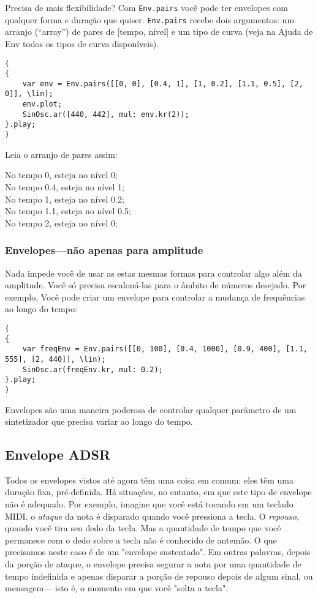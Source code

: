 Precisa de mais flexibilidade? Com \texttt{Env.pairs} você pode ter envelopes com qualquer forma e duração que quiser. \texttt{Env.pairs} recebe dois argumentos: um arranjo (“array”) de pares de [tempo, nível] e um tipo de curva (veja na Ajuda de Env todos os tipos de curva disponíveis).

 
\begin{lstlisting}[style=SuperCollider-IDE, basicstyle=\scttfamily\footnotesize]
(
{
	var env = Env.pairs([[0, 0], [0.4, 1], [1, 0.2], [1.1, 0.5], [2, 0]], \lin);
	env.plot;
	SinOsc.ar([440, 442], mul: env.kr(2));
}.play;
)
\end{lstlisting}
 
Leia o arranjo de pares assim:
\begin{center}
No tempo 0, esteja no nível 0;\\
No tempo 0.4, esteja no nível 1;\\
No tempo 1, esteja no nível 0.2;\\
No tempo 1.1, esteja no nível 0.5;\\
No tempo 2, esteja no nível 0;
\end{center}

\subsubsection{Envelopes---não apenas para amplitude}

Nada impede você de usar as estas mesmas formas para controlar algo além da amplitude. Você só precisa escaloná-las para o âmbito de números desejado. Por exemplo, Você pode criar um envelope para controlar a mudança de frequências ao longo do tempo:

\begin{lstlisting}[style=SuperCollider-IDE, basicstyle=\scttfamily\footnotesize]
(
{
	var freqEnv = Env.pairs([[0, 100], [0.4, 1000], [0.9, 400], [1.1, 555], [2, 440]], \lin);
	SinOsc.ar(freqEnv.kr, mul: 0.2);
}.play;
)
\end{lstlisting}

Envelopes são uma maneira poderosa de controlar qualquer parâmetro de um sintetizador que precisa variar ao longo do tempo.

\subsection{Envelope ADSR}

Todos os envelopes vistos até agora têm uma coisa em comum: eles têm uma duração fixa, pré-definida. Há situações, no entanto, em que este tipo de envelope não é adequado. Por exemplo, imagine que você está tocando em um teclado MIDI. o \textit{ataque} da nota é disparado quando você pressiona a tecla. O \textit{repouso}, quando você tira seu dedo da tecla. Mas a quantidade de tempo que você permanece com o dedo sobre a tecla não é conhecido de antemão. O que precisamos neste caso é de um "envelope sustentado". Em outras palavras, depois da porção de ataque, o envelope precisa segurar a nota por uma quantidade de tempo indefinida e apenas disparar a porção de repouso depois de algum sinal, ou mensagem--- isto é, o momento em que você "solta a tecla".

